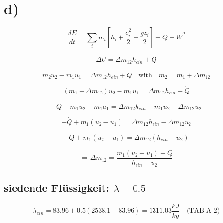 

\section*{d)}

\begin{equation*}
\frac{dE}{dt} = \sum_i \dot{m}_i \left[ h_i + \frac{c_i^2}{2} + \frac{g z_i}{2} \right] - \dot{Q} - \dot{W}^o
\end{equation*}

\begin{equation*}
\Delta U = \Delta m_{12} h_{ein} + \dot{Q}
\end{equation*}

\begin{equation*}
m_2 u_2 - m_1 u_1 = \Delta m_{12} h_{ein} + \dot{Q} \quad \text{with} \quad m_2 = m_1 + \Delta m_{12}
\end{equation*}

\begin{equation*}
(m_1 + \Delta m_{12}) u_2 - m_1 u_1 = \Delta m_{12} h_{ein} + \dot{Q}
\end{equation*}

\begin{equation*}
- \dot{Q} + m_1 u_2 - m_1 u_1 = \Delta m_{12} h_{ein} - m_1 u_2 - \Delta m_{12} u_2
\end{equation*}

\begin{equation*}
- \dot{Q} + m_1 (u_2 - u_1) = \Delta m_{12} h_{ein} - \Delta m_{12} u_2
\end{equation*}

\begin{equation*}
- \dot{Q} + m_1 (u_2 - u_1) = \Delta m_{12} (h_{ein} - u_2)
\end{equation*}

\begin{equation*}
\Rightarrow \Delta m_{12} = \frac{m_1 (u_2 - u_1) - \dot{Q}}{h_{ein} - u_2}
\end{equation*}

\subsection*{siedende Flüssigkeit: $\lambda = 0.5$}

\begin{equation*}
h_{ein} = 83.96 + 0.5 (2538.1 - 83.96) = 1311.03 \frac{kJ}{kg} \quad \text{(TAB-A-2)}
\end{equation*}

